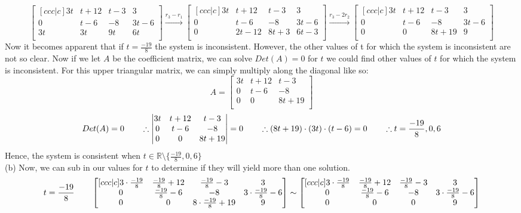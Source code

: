 \documentclass[12pt]{article}
\begin{document}
$$\begin{bmatrix}[ccc|c]
   3t & t+12 & t-3 & 3 \\
   0 & t-6 & -8 & 3t-6 \\
   3t & 3t & 9t & 6t \\
\end{bmatrix} \overset{r_3-r_1}{\longrightarrow} 
\begin{bmatrix}[ccc|c]
   3t & t+12 & t-3 & 3 \\
   0 & t-6 & -8 & 3t-6 \\
   0 & 2t-12 & 8t+3 & 6t-3 \\
\end{bmatrix} \overset{r_3-2r_2}{\longrightarrow} 
\begin{bmatrix}[ccc|c]
   3t & t+12 & t-3 & 3 \\
   0 & t-6 & -8 & 3t-6 \\
   0 & 0 & 8t+19 & 9 \\
\end{bmatrix}
$$
Now it becomes apparent that if $t=\frac{-19}{8}$ the system is inconsistent. However, the other values of t for which the system is inconsistent are not so clear. Now if we let $A$ be the coefficient matrix, we can solve $Det(A)=0$ for $t$ we could find other values of $t$ for which the system is inconsistent. For this upper triangular matrix, we can simply multiply along the diagonal like so:
$$
A = 
\begin{bmatrix}
   3t & t+12 & t-3 \\
   0 & t-6 & -8  \\
   0 & 0 & 8t+19 \\
\end{bmatrix}
$$
$$
Det(A)=0 \hspace{20px}
\therefore
\begin{vmatrix}
   3t & t+12 & t-3\\
   0 & t-6 & -8\\
   0 & 0 & 8t+19\\
\end{vmatrix} = 0
\hspace*{20pt}
\therefore(8t+19)\cdot(3t)\cdot(t-6)=0 
\hspace*{20pt}
\therefore t=\frac{-19}{8}, 0, 6
$$
Hence, the system is consistent when $t \in \mathbb{R} \setminus \{\frac{-19}{8},0,6\}$ \\
\medskip
(b) Now, we can sub in our values for $t$ to determine if they will yield more than one solution.
$$
t = \frac{-19}{8}
\hspace*{20pt}
\begin{bmatrix}[ccc|c]
   3\cdot\frac{-19}{8} & \frac{-19}{8}+12 & \frac{-19}{8}-3 & 3 \\
   0 & \frac{-19}{8}-6 & -8 & 3\cdot\frac{-19}{8}-6 \\
   0 & 0 & 8\cdot\frac{-19}{8}+19 & 9 \\
\end{bmatrix}  
\sim
\begin{bmatrix}[ccc|c]
   3\cdot\frac{-19}{8} & \frac{-19}{8}+12 & \frac{-19}{8}-3 & 3 \\
   0 & \frac{-19}{8}-6 & -8 & 3\cdot\frac{-19}{8}-6 \\
   0 & 0 & 0 & 9 \\
\end{bmatrix}
$$
\end{document}
